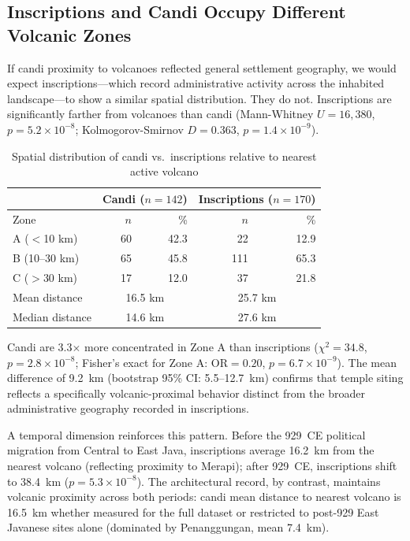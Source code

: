 \documentclass[12pt,a4paper]{article}
\begin{document}
\subsection{Inscriptions and Candi Occupy Different Volcanic Zones}

If candi proximity to volcanoes reflected general settlement geography, we would expect inscriptions---which record administrative activity across the inhabited landscape---to show a similar spatial distribution. They do not. Inscriptions are significantly farther from volcanoes than candi (Mann-Whitney $U=16{,}380$, $p=5.2\times10^{-8}$; Kolmogorov-Smirnov $D=0.363$, $p=1.4\times10^{-9}$).

\begin{table}[h]
\centering
\caption{Spatial distribution of candi vs.\ inscriptions relative to nearest active volcano}
\begin{tabular}{lrrrr}
\toprule
 & \multicolumn{2}{c}{Candi ($n=142$)} & \multicolumn{2}{c}{Inscriptions ($n=170$)} \\
\midrule
Zone & $n$ & \% & $n$ & \% \\
\midrule
A ($<$10 km) & 60 & 42.3 & 22 & 12.9 \\
B (10--30 km) & 65 & 45.8 & 111 & 65.3 \\
C ($>$30 km) & 17 & 12.0 & 37 & 21.8 \\
\midrule
Mean distance & \multicolumn{2}{c}{16.5 km} & \multicolumn{2}{c}{25.7 km} \\
Median distance & \multicolumn{2}{c}{14.6 km} & \multicolumn{2}{c}{27.6 km} \\
\bottomrule
\end{tabular}
\label{tab:inscr_candi}
\end{table}

Candi are 3.3$\times$ more concentrated in Zone A than inscriptions ($\chi^2=34.8$, $p=2.8\times10^{-8}$; Fisher's exact for Zone A: OR$=0.20$, $p=6.7\times10^{-9}$). The mean difference of 9.2~km (bootstrap 95\% CI: 5.5--12.7~km) confirms that temple siting reflects a specifically volcanic-proximal behavior distinct from the broader administrative geography recorded in inscriptions.

A temporal dimension reinforces this pattern. Before the 929~CE political migration from Central to East Java, inscriptions average 16.2~km from the nearest volcano (reflecting proximity to Merapi); after 929~CE, inscriptions shift to 38.4~km ($p=5.3\times10^{-8}$). The architectural record, by contrast, maintains volcanic proximity across both periods: candi mean distance to nearest volcano is 16.5~km whether measured for the full dataset or restricted to post-929 East Javanese sites alone (dominated by Penanggungan, mean 7.4~km).
\end{document}
